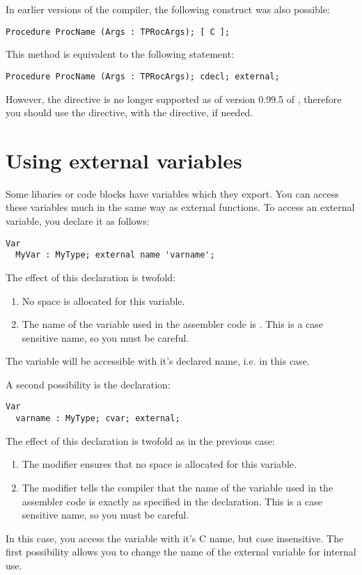 In earlier versions of the \fpc compiler, the following construct was
also possible:
\begin{verbatim}
Procedure ProcName (Args : TPRocArgs); [ C ];
\end{verbatim}
This method is equivalent to the following statement:
\begin{verbatim}
Procedure ProcName (Args : TPRocArgs); cdecl; external;
\end{verbatim}
However, the \var{[ C ]} directive is no longer supported as of version
0.99.5  of \fpc, therefore you should use the  directive,
with the  directive, if needed.

\section{Using external variables}
\label{se:ExternalVars}

Some libaries or code blocks have variables which they export. You can access
these variables much in the same way as external functions. To access an
external variable, you declare it as follows:

\begin{verbatim}
Var
  MyVar : MyType; external name 'varname';
\end{verbatim}
The effect of this declaration is twofold:
\begin{enumerate}
\item No space is allocated for this variable.
\item The name of the variable used in the assembler code is .
This is a case sensitive name, so you must be careful.
\end{enumerate}
The variable will be
accessible with it's declared name, i.e.  in this case.

A second possibility is the declaration:
\begin{verbatim}
Var
  varname : MyType; cvar; external;
\end{verbatim}
The effect of this declaration is twofold as in the previous case:
\begin{enumerate}
\item The  modifier ensures that no space is allocated for
this variable.
\item The  modifier tells the compiler that the name of the
variable used in the assembler code is exactly as specified in the
declaration. This is a case sensitive name, so you must be careful.
\end{enumerate}
In this case, you access the variable with it's C name, but case
insensitive. The first possibility allows you to change the name of the
external variable for  internal use.

